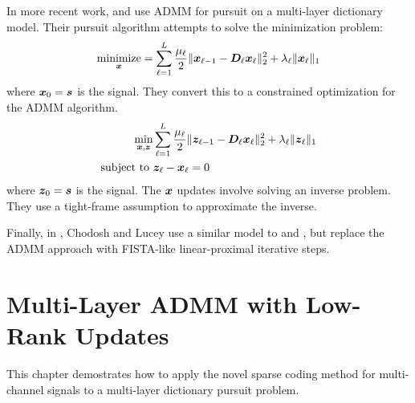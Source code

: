 In more recent work, \cite{murdock2018deep} and \cite{chodosh2018deep} use ADMM for pursuit on a multi-layer dictionary model. Their pursuit algorithm attempts to solve the minimization problem:
\begin{equation}
\operatorname*{\text{minimize}}_{\bm{x}} = \sum_{\ell = 1}^{L} \frac{\mu_{\ell}}{2}\|\bm{x}_{\ell - 1} -\bm{D}_{\ell}\bm{x}_{\ell}\|_2^2 + \lambda_{\ell}\|\bm{x}_{\ell}\|_1
\end{equation}
where $\bm{x}_0 = \bm{s}$ is the signal. They convert this to a constrained optimization for the ADMM algorithm.
\begin{equation}
\begin{aligned}
\min_{\bm{x},\bm{z}} & \sum_{\ell = 1}^{L} \frac{\mu_{\ell}}{2}\|\bm{z}_{\ell - 1} -\bm{D}_{\ell}\bm{x}_{\ell}\|_2^2 + \lambda_{\ell}\|\bm{z}_{\ell}\|_1 \\
\text{subject to } & \bm{z}_{\ell} - \bm{x}_{\ell} = 0
\end{aligned} \label{equation:ADMM Multi-Layer Pursuit Objective}
\end{equation}
where $\bm{z}_0 = \bm{s}$ is the signal. The $\bm{x}$ updates involve solving an inverse problem. They use a tight-frame assumption to approximate the inverse.

Finally, in \cite{chodosh2020use}, Chodosh and Lucey use a similar model to \cite{murdock2018deep} and \cite{chodosh2018deep}, but replace the ADMM approach with FISTA-like linear-proximal iterative steps.

\section{Multi-Layer ADMM with Low-Rank Updates}
This chapter demostrates how to apply the novel sparse coding method for multi-channel signals to a multi-layer dictionary pursuit problem.

